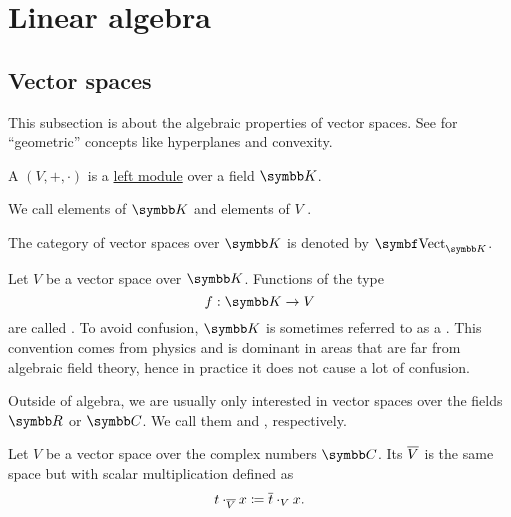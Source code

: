 \section{Linear algebra}\label{sec:linear_algebra}
\subsection{Vector spaces}\label{subsec:vector_spaces}

This subsection is about the algebraic properties of vector spaces. See  for \enquote{geometric} concepts like hyperplanes and convexity.

\begin{Definition}\label{def:vector_space}
  A  \( (V, +, \cdot) \) is a \hyperref[def:left_module]{left module} over a field \( \BK \).

  We call elements of \( \BK \)  and elements of \( V \) .

  The category of vector spaces over \( \BK \) is denoted by \( \Cat{Vect}_{\BK} \).
\end{Definition}

\begin{Definition}\label{def:vector_field}
  Let \( V \) be a vector space over \( \BK \). Functions of the type
  \begin{equation*}
    f: \BK \to V
  \end{equation*}
  are called . To avoid confusion, \( \BK \) is sometimes referred to as a . This convention comes from physics and is dominant in areas that are far from algebraic field theory, hence in practice it does not cause a lot of confusion.
\end{Definition}

\begin{Remark}\label{remark:real_vector_space}
  Outside of algebra, we are usually only interested in vector spaces over the fields \( \BR \) or \( \BC \). We call them  and , respectively.
\end{Remark}

\begin{Definition}\label{def:complex_conjucate_vector_space}
  Let \( V \) be a vector space over the complex numbers \( \BC \). Its  \( \overline{V} \) is the same space but with scalar multiplication defined as
  \begin{equation*}
    t \cdot_{\overline{V}} x \coloneqq \overline{t} \cdot_V x.
  \end{equation*}
\end{Definition}

